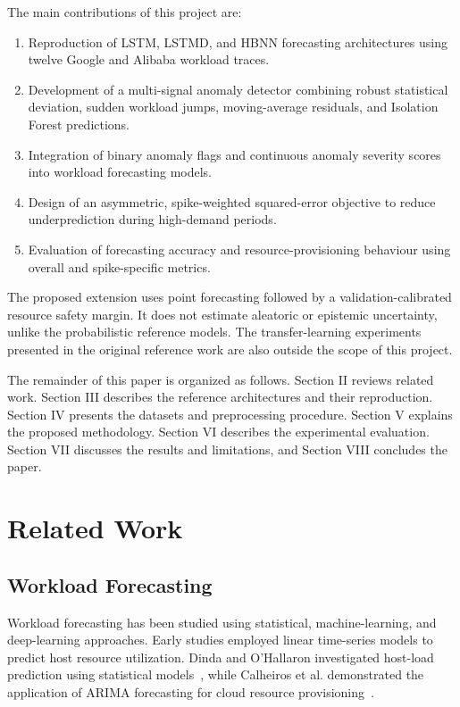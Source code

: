 \documentclass[conference]{IEEEtran}
\begin{document}
The main contributions of this project are:

\begin{enumerate}
\item Reproduction of LSTM, LSTMD, and HBNN forecasting architectures using twelve Google and Alibaba workload traces.

\item Development of a multi-signal anomaly detector combining robust statistical deviation, sudden workload jumps, moving-average residuals, and Isolation Forest predictions.

\item Integration of binary anomaly flags and continuous anomaly severity scores into workload forecasting models.

\item Design of an asymmetric, spike-weighted squared-error objective to reduce underprediction during high-demand periods.

\item Evaluation of forecasting accuracy and resource-provisioning behaviour using overall and spike-specific metrics.
\end{enumerate}

The proposed extension uses point forecasting followed by a validation-calibrated resource safety margin. It does not estimate aleatoric or epistemic uncertainty, unlike the probabilistic reference models. The transfer-learning experiments presented in the original reference work are also outside the scope of this project.

The remainder of this paper is organized as follows. Section II reviews related work. Section III describes the reference architectures and their reproduction. Section IV presents the datasets and preprocessing procedure. Section V explains the proposed methodology. Section VI describes the experimental evaluation. Section VII discusses the results and limitations, and Section VIII concludes the paper.

\section{Related Work}

\subsection{Workload Forecasting}

Workload forecasting has been studied using statistical, machine-learning, and deep-learning approaches. Early studies employed linear time-series models to predict host resource utilization. Dinda and O'Hallaron investigated host-load prediction using statistical models~\cite{dinda2000}, while Calheiros et al. demonstrated the application of ARIMA forecasting for cloud resource provisioning~\cite{calheiros2015}.
\end{document}
